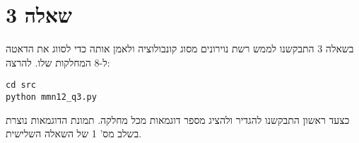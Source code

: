 \HE
\section*{שאלה {3}}
בשאלה 3 התבקשנו לממש רשת נוירונים מסוג קונבולוציה ולאמן אותה כדי לסווג את הדאטה ל-8 המחלקות שלו.\newline
להרצה:
\EN
\begin{framed}
\begin{verbatim}
cd src
python mmn12_q3.py
\end{verbatim}
\end{framed}
\HE

כצעד ראשון התבקשנו להגדיר  ולהציג מספר דוגמאות מכל מחלקה.
תמונת הדוגמאות נוצרת בשלב מס' 1 של השאלה השלישית. 
